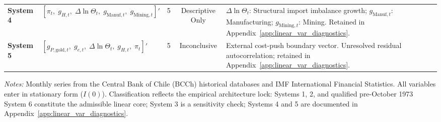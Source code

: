 \begin{table}[htbp]
\begin{tabularx}{\textwidth}{llcc>{\RaggedRight}X}
\addlinespace[0.3em]
\textbf{System 4} & $[\pi_t, \; g_{H,t}, \; \Delta \ln \Theta_t, \; g_{\text{Manuf},t}, \; g_{\text{Mining},t}]'$ & 5 & Descriptive Only & $\Delta \ln \Theta_t$: Structural import imbalance growth; $g_{\text{Manuf},t}$: Manufacturing; $g_{\text{Mining},t}$: Mining. Retained in Appendix~\ref{app:linear_var_diagnostics}. \\
\addlinespace[0.3em]
\textbf{System 5} & $[g_{P,\text{gold},t}, \; g_{e,t}, \; \Delta \ln \Theta_t, \; g_{H,t}, \; \pi_t]'$ & 5 & Inconclusive & External cost-push boundary vector. Unresolved residual autocorrelation; retained in Appendix~\ref{app:linear_var_diagnostics}. \\
\bottomrule
\end{tabularx}
\begin{minipage}{\textwidth}
\vspace{0.3em}
\footnotesize \textit{Notes:} Monthly series from the Central Bank of Chile (BCCh) historical databases and IMF International Financial Statistics. All variables enter in stationary form ($I(0)$). Classification reflects the empirical architecture lock: Systems 1, 2, and qualified pre-October 1973 System 6 constitute the admissible linear core; System 3 is a sensitivity check; Systems 4 and 5 are documented in Appendix~\ref{app:linear_var_diagnostics}.
\end{minipage}
\end{table}
